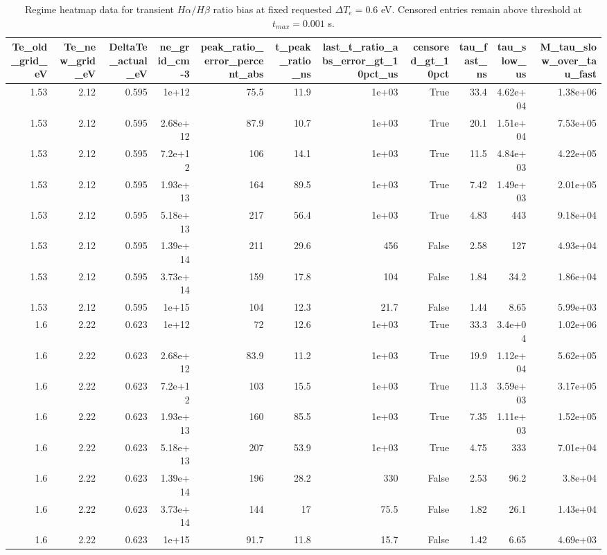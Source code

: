 \begin{table}
\caption{Regime heatmap data for transient $H\alpha/H\beta$ ratio bias at fixed requested $\Delta T_e=0.6$ eV. Censored entries remain above threshold at $t_{max}=0.001$ s.}
\label{tab:balmer_regime_heatmap}
\begin{tabular}{rrrrrrrrrrr}
\toprule
Te_old_grid_eV & Te_new_grid_eV & DeltaTe_actual_eV & ne_grid_cm-3 & peak_ratio_error_percent_abs & t_peak_ratio_ns & last_t_ratio_abs_error_gt_10pct_us & censored_gt_10pct & tau_fast_ns & tau_slow_us & M_tau_slow_over_tau_fast \\
\midrule
1.53 & 2.12 & 0.595 & 1e+12 & 75.5 & 11.9 & 1e+03 & True & 33.4 & 4.62e+04 & 1.38e+06 \\
1.53 & 2.12 & 0.595 & 2.68e+12 & 87.9 & 10.7 & 1e+03 & True & 20.1 & 1.51e+04 & 7.53e+05 \\
1.53 & 2.12 & 0.595 & 7.2e+12 & 106 & 14.1 & 1e+03 & True & 11.5 & 4.84e+03 & 4.22e+05 \\
1.53 & 2.12 & 0.595 & 1.93e+13 & 164 & 89.5 & 1e+03 & True & 7.42 & 1.49e+03 & 2.01e+05 \\
1.53 & 2.12 & 0.595 & 5.18e+13 & 217 & 56.4 & 1e+03 & True & 4.83 & 443 & 9.18e+04 \\
1.53 & 2.12 & 0.595 & 1.39e+14 & 211 & 29.6 & 456 & False & 2.58 & 127 & 4.93e+04 \\
1.53 & 2.12 & 0.595 & 3.73e+14 & 159 & 17.8 & 104 & False & 1.84 & 34.2 & 1.86e+04 \\
1.53 & 2.12 & 0.595 & 1e+15 & 104 & 12.3 & 21.7 & False & 1.44 & 8.65 & 5.99e+03 \\
1.6 & 2.22 & 0.623 & 1e+12 & 72 & 12.6 & 1e+03 & True & 33.3 & 3.4e+04 & 1.02e+06 \\
1.6 & 2.22 & 0.623 & 2.68e+12 & 83.9 & 11.2 & 1e+03 & True & 19.9 & 1.12e+04 & 5.62e+05 \\
1.6 & 2.22 & 0.623 & 7.2e+12 & 103 & 15.5 & 1e+03 & True & 11.3 & 3.59e+03 & 3.17e+05 \\
1.6 & 2.22 & 0.623 & 1.93e+13 & 160 & 85.5 & 1e+03 & True & 7.35 & 1.11e+03 & 1.52e+05 \\
1.6 & 2.22 & 0.623 & 5.18e+13 & 207 & 53.9 & 1e+03 & True & 4.75 & 333 & 7.01e+04 \\
1.6 & 2.22 & 0.623 & 1.39e+14 & 196 & 28.2 & 330 & False & 2.53 & 96.2 & 3.8e+04 \\
1.6 & 2.22 & 0.623 & 3.73e+14 & 144 & 17 & 75.5 & False & 1.82 & 26.1 & 1.43e+04 \\
1.6 & 2.22 & 0.623 & 1e+15 & 91.7 & 11.8 & 15.7 & False & 1.42 & 6.65 & 4.69e+03 \\

\end{tabular}
\end{table}
